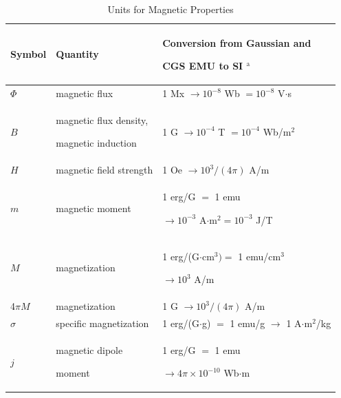 \documentclass{ieeeaccess}
\begin{document}
\begin{table}
    \caption{Units for Magnetic Properties}
    \label{table}
    \setlength{\tabcolsep}{3pt}
    \begin{tabular}{|p{25pt}|p{75pt}|p{115pt}|}
        \hline
        Symbol                                         &
        Quantity                                       &
        Conversion from Gaussian and \par CGS EMU to SI $^{\mathrm{a}}$                 \\
        \hline
        $\Phi $                                        &
        magnetic flux                                  &
        1 Mx $\to  10^{-8}$ Wb $= 10^{-8}$ V$\cdot $s                                   \\
        $B$                                            &
        magnetic flux density, \par magnetic induction &
        1 G $\to  10^{-4}$ T $= 10^{-4}$ Wb/m$^{2}$                                     \\
        $H$                                            &
        magnetic field strength                        &
        1 Oe $\to  10^{3}/(4\pi )$ A/m                                                  \\
        $m$                                            &
        magnetic moment                                &
        1 erg/G $=$ 1 emu \par $\to 10^{-3}$ A$\cdot $m$^{2} = 10^{-3}$ J/T             \\
        $M$                                            &
        magnetization                                  &
        1 erg/(G$\cdot $cm$^{3}) =$ 1 emu/cm$^{3}$ \par $\to 10^{3}$ A/m                \\
        4$\pi M$                                       &
        magnetization                                  &
        1 G $\to  10^{3}/(4\pi )$ A/m                                                   \\
        $\sigma $                                      &
        specific magnetization                         &
        1 erg/(G$\cdot $g) $=$ 1 emu/g $\to $ 1 A$\cdot $m$^{2}$/kg                     \\
        $j$                                            &
        magnetic dipole \par moment                    &
        1 erg/G $=$ 1 emu \par $\to 4\pi \times  10^{-10}$ Wb$\cdot $m                  \\

\end{tabular}
\end{table}
\end{document}
